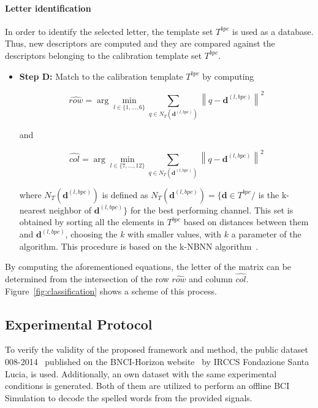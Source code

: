 \documentclass[utf8]{frontiersSCNS} %
\begin{document}
\paragraph{Letter identification}

In order to identify the selected letter, the template set $T^{bpc}$ is used as a database.  Thus, new descriptors are computed and they are compared against the descriptors belonging to the calibration template set $T^{bpc}$.

\begin{itemize}

\item \textbf{Step D:} Match to the calibration template $T^{bpc}$ by computing  

\begin{equation}
\hat{row} = \arg \min_{l \in \{1,\dots,6\}} \sum_{q \in N_T(\mathbf{d}^{(l,bpc)})}^{} {\left\lVert q -  \mathbf{d}^{(l,bpc)} \right\rVert}  ^{2}
\label{eq:multiclassificationrow}
\end{equation}

\noindent and

\begin{equation}
\hat{col} = \arg \min_{l \in \{7,\dots,12\}} \sum_{q \in N_T(\mathbf{d}^{(l,bpc)})}^{} {\left\lVert q -  \mathbf{d}^{(l,bpc)} \right\rVert} ^{2}
\label{eq:multiclassificationcol}
\end{equation}

\noindent where $N_T(\mathbf{d}^{(l,bpc)})$  is defined as $N_T(\mathbf{d}^{(l,bpc)}) = \{\mathbf{d} \in T^{bpc} / $  is the k-nearest neighbor of $ \mathbf{d}^{(l,bpc)} \}$ for the best performing channel.  This set is obtained by sorting all the elements in $T^{bpc}$ based on distances between them and $\mathbf{d}^{(l,bpc)}$, choosing the $k$ with smaller values, with $k$ a parameter of the algorithm.  This procedure is based on the k-NBNN  algorithm~\citep{Boiman2008}.

\end{itemize}
By computing the aforementioned equations, the letter of the matrix can be determined from the intersection of the row $ \hat{row} $ and column $ \hat{col} $. 
Figure~\ref{fig:classification} shows a scheme of this process. 

\subsection{Experimental Protocol} \label{Protocol}

To verify the validity of the proposed framework and method, the public dataset 008-2014~\citep{Riccio2013} published on the BNCI-Horizon website~\citep{Brunner2014} by  IRCCS Fondazione Santa Lucia, is used. Additionally, an own dataset with the same experimental conditions is generated. Both of them are utilized to perform an offline BCI Simulation to decode the spelled words from the provided signals. 
\end{document}
